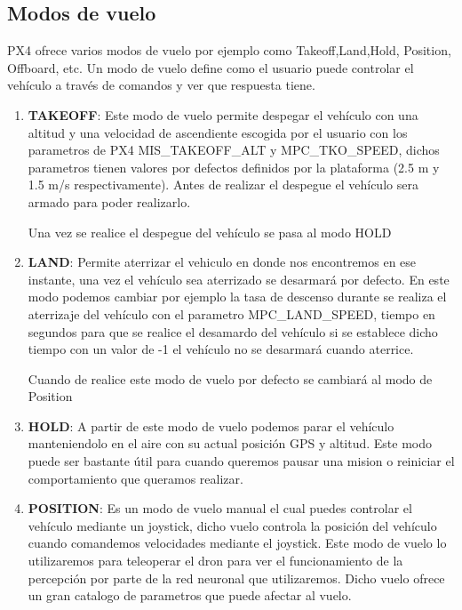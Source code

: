 \subsection{Modos de vuelo}
\label{sec:flight modes} 

PX4 ofrece varios modos de vuelo por ejemplo como Takeoff,Land,Hold, Position, Offboard, etc. Un modo de vuelo define como el usuario puede controlar el vehículo a través de comandos
  y ver que respuesta tiene. 


  \begin{enumerate}
    \item \textbf{TAKEOFF}: Este modo de vuelo permite despegar el vehículo con una altitud y una velocidad de ascendiente escogida por el usuario con los parametros de PX4 MIS\_TAKEOFF\_ALT y
    MPC\_TKO\_SPEED, dichos parametros tienen valores por defectos definidos por la plataforma (2.5 m y 1.5 m/s respectivamente). Antes de realizar el despegue el vehículo sera armado 
    para poder realizarlo.

    Una vez se realice el despegue del vehículo se pasa al modo HOLD 
    \item \textbf{LAND}: Permite aterrizar el vehiculo en donde nos encontremos en ese instante, una vez el vehículo sea aterrizado se desarmará por defecto. En este modo podemos cambiar por ejemplo
    la tasa de descenso durante se realiza el aterrizaje del vehículo con el parametro MPC\_LAND\_SPEED, tiempo en segundos para que se realice el desamardo del vehículo si se establece dicho tiempo
    con un valor de -1 el vehículo no se desarmará cuando aterrice.
    
    Cuando de realice este modo de vuelo por defecto se cambiará al modo de Position

    \item \textbf{HOLD}: A partir de este modo de vuelo podemos parar el vehículo manteniendolo en el aire con su actual posición GPS y altitud. Este modo puede ser bastante útil para cuando queremos
    pausar una mision o reiniciar el comportamiento que queramos realizar. 

    \item \textbf{POSITION}: Es un modo de vuelo manual el cual puedes controlar el vehículo mediante un joystick, dicho vuelo controla la posición del vehículo cuando comandemos velocidades 
    mediante el joystick. Este modo de vuelo lo utilizaremos para teleoperar el dron para ver el funcionamiento de la percepción por parte de la red neuronal que utilizaremos.
    Dicho vuelo ofrece un gran catalogo de parametros que puede afectar al vuelo.


\end{enumerate}
